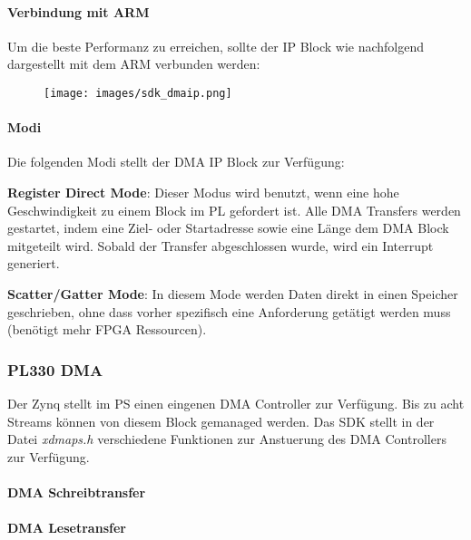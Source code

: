 \begin{multicols}{2}
\paragraph{Verbindung mit ARM}
Um die beste  Performanz zu erreichen, sollte der IP Block wie nachfolgend dargestellt mit dem ARM verbunden werden:
\begin{figure}[H]
    \texttt{[image: images/sdk\_dmaip.png]}
\end{figure}

\paragraph{Modi}
Die folgenden Modi stellt der DMA IP Block zur Verfügung:
\begin{compactitem}
    \item \textbf{Register Direct Mode}: Dieser Modus wird benutzt, wenn eine hohe Geschwindigkeit zu einem Block im PL gefordert ist. Alle DMA Transfers werden gestartet, indem eine Ziel- oder Startadresse sowie eine Länge dem DMA Block mitgeteilt wird. Sobald der Transfer abgeschlossen wurde, wird ein Interrupt generiert.
    \item \textbf{Scatter/Gatter Mode}: In diesem Mode werden Daten direkt in einen Speicher geschrieben, ohne dass vorher spezifisch eine Anforderung getätigt werden muss (benötigt mehr FPGA Ressourcen).
\end{compactitem}
\end{multicols}
\subsubsection{PL330 DMA}
Der Zynq stellt im PS einen eingenen DMA Controller zur Verfügung. Bis zu acht Streams können von diesem Block gemanaged werden. Das SDK stellt in der Datei \textit{xdmaps.h} verschiedene Funktionen zur Anstuerung des DMA Controllers zur Verfügung.

\paragraph{DMA Schreibtransfer}


\paragraph{DMA Lesetransfer}

